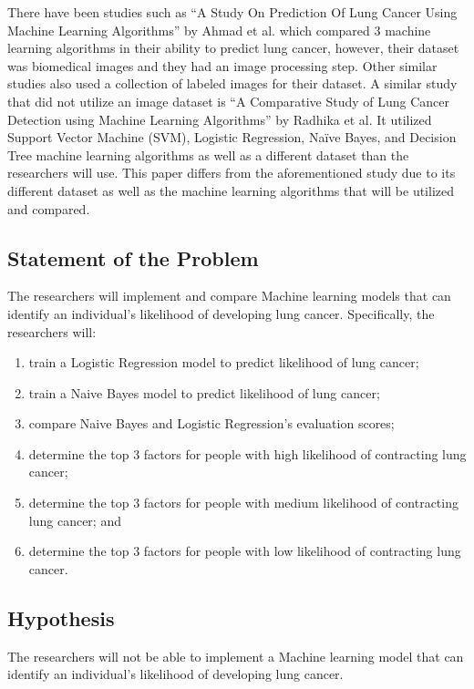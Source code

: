 \documentclass[runningheads]{llncs}
\begin{document}
There have been studies such as “A Study On Prediction Of Lung Cancer Using Machine Learning Algorithms” by Ahmad et al. \cite{gupta2022} which compared 3 machine learning algorithms in their ability to predict lung cancer, however, their dataset was biomedical images and they had an image processing step. Other similar studies also used a collection of labeled images for their dataset. A similar study that did not utilize an image dataset is “A Comparative Study of Lung Cancer Detection using Machine Learning Algorithms” by Radhika et al. \cite{radhika2019} It utilized Support Vector Machine (SVM), Logistic Regression, Naïve Bayes, and Decision Tree machine learning algorithms as well as a different dataset than the researchers will use. This paper differs from the aforementioned study due to its different dataset as well as the machine learning algorithms that will be utilized and compared.

\subsection{Statement of the Problem}
The researchers will implement and compare Machine learning models that can identify an individual’s likelihood of developing lung cancer. Specifically, the researchers will:
\begin{enumerate}
	\item train a Logistic Regression model to predict likelihood of lung cancer;
	\item train a Naive Bayes model to predict likelihood of lung cancer;
	\item compare Naive Bayes and Logistic Regression’s evaluation scores;
	\item determine the top 3 factors for people with high likelihood of contracting lung cancer; 
	\item determine the top 3 factors for people with medium likelihood of contracting lung cancer; and
	\item determine the top 3 factors for people with low likelihood of contracting lung cancer.
\end{enumerate}

\subsection{Hypothesis}
The researchers will not be able to implement a Machine learning model that can identify an individual’s likelihood of developing lung cancer.
\end{document}
